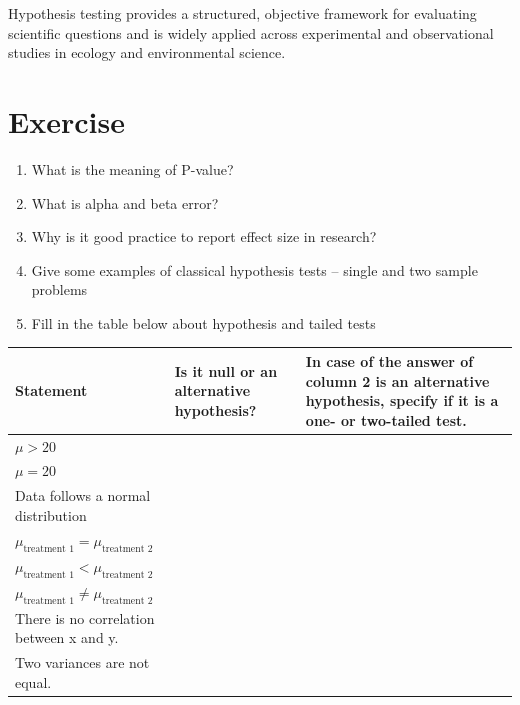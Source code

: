 \documentclass[
]{book}
\newcounter{none} %
\providecommand{\tightlist}{%
  \setlength{\itemsep}{0pt}\setlength{\parskip}{0pt}}
\begin{document}
Hypothesis testing provides a structured, objective framework for evaluating scientific questions and is widely applied across experimental and observational studies in ecology and environmental science.

\section{Exercise}\label{exercise-1}

\begin{enumerate}
\def\labelenumi{\arabic{enumi}.}
\tightlist
\item
  What is the meaning of P-value?
\item
  What is alpha and beta error?
\item
  Why is it good practice to report effect size in research?
\item
  Give some examples of classical hypothesis tests -- single and two sample problems
\item
  Fill in the table below about hypothesis and tailed tests
\end{enumerate}

{\def\LTcaptype{none} %
\begin{longtable}[]{@{}
  >{\raggedright\arraybackslash}p{}
  >{\raggedright\arraybackslash}p{}
  >{\raggedright\arraybackslash}p{}@{}}
\toprule\noalign{}
\begin{minipage}[b]{\linewidth}\raggedright
Statement
\end{minipage} & \begin{minipage}[b]{\linewidth}\raggedright
Is it null or an alternative hypothesis?
\end{minipage} & \begin{minipage}[b]{\linewidth}\raggedright
In case of the answer of column 2 is an alternative hypothesis, specify if it is a one- or two-tailed test.
\end{minipage} \\
\midrule\noalign{}
\endhead
\bottomrule\noalign{}
\endlastfoot
\(\mu > 20\) & & \\
\(\mu = 20\) & & \\
Data follows a normal distribution & & \\
\(\mu_{\text{treatment 1}} = \mu_{\text{treatment 2}}\) & & \\
\(\mu_{\text{treatment 1}} < \mu_{\text{treatment 2}}\) & & \\
\(\mu_{\text{treatment 1}} \neq \mu_{\text{treatment 2}}\) & & \\
There is no correlation between x and y. & & \\
Two variances are not equal. & & \\
\end{longtable}
}
\end{document}
